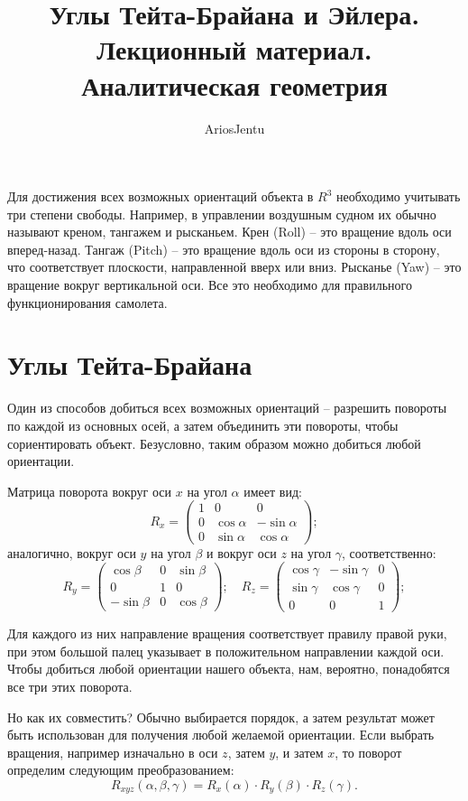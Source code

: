 \documentclass[fleqn]{extarticle}
\title{Углы Тейта-Брайана и Эйлера. Лекционный материал.\\Аналитическая геометрия}
\author{AriosJentu}
\date{}
\begin{document}
	\maketitle

	Для достижения всех возможных ориентаций объекта в $R^3$ необходимо учитывать три степени свободы. 
	Например, в управлении воздушным судном их обычно называют креном, тангажем и рысканьем. 
	Крен (Roll) -- это вращение вдоль оси вперед-назад. 
	Тангаж (Pitch) -- это вращение вдоль оси из стороны в сторону, что соответствует плоскости, направленной вверх или вниз.
	Рысканье (Yaw) -- это вращение вокруг вертикальной оси. Все это необходимо для правильного функционирования самолета.

	\section{Углы Тейта-Брайана}

	Один из способов добиться всех возможных ориентаций -- разрешить повороты по каждой из основных осей, 
	а затем объединить эти повороты, чтобы сориентировать объект. 
	Безусловно, таким образом можно добиться любой ориентации.

	Матрица поворота вокруг оси $x$ на угол $\alpha$ имеет вид:
	\[ R_x = \begin{pmatrix} 1 & 0 & 0 \\ 0 & \cos{\alpha} & -\sin{\alpha} \\ 0 & \sin{\alpha} & \cos{\alpha} \end{pmatrix}; \]
	аналогично, вокруг оси $y$ на угол $\beta$ и вокруг оси $z$ на угол $\gamma$, соответственно:
	\[ R_y = \begin{pmatrix} \cos{\beta} & 0 & \sin{\beta} \\ 0 & 1 & 0 \\ -\sin{\beta} & 0 & \cos{\beta} \end{pmatrix}; \quad R_z = \begin{pmatrix} \cos{\gamma} & -\sin{\gamma} & 0 \\ \sin{\gamma} & \cos{\gamma} & 0 \\ 0 & 0 & 1 \end{pmatrix}; \] 

	Для каждого из них направление вращения соответствует правилу правой руки, 
	при этом большой палец указывает в положительном направлении каждой оси.
	Чтобы добиться любой ориентации нашего объекта, нам, вероятно, понадобятся все три этих поворота. 

	Но как их совместить?
	Обычно выбирается порядок, а затем результат может быть использован для получения любой желаемой ориентации.
	Если выбрать вращения, например изначально в оси $z$, затем $y$, и затем $x$, то поворот определим следующим преобразованием:
	\[ R_{xyz}(\alpha, \beta, \gamma) = R_x(\alpha) \cdot R_y(\beta) \cdot R_z(\gamma). \]
\end{document}
